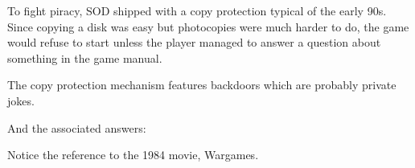 \documentclass[book.tex]{subfiles}
\begin{document}
   \par
\begin{figure}[H]
\centering
 \end{figure}
 \par

To fight piracy, SOD shipped with a copy protection typical of the early 90s. Since copying a disk was easy but photocopies were much harder to do, the game would refuse to start unless the player managed to answer a question about something in the game manual.\\
    \par
\begin{figure}[H]
\centering
 \end{figure}
 \par
 The copy protection mechanism features backdoors which are probably private jokes.
\par
\begin{minipage}{\textwidth}

\end{minipage}
\par
And the associated answers:\\
\par
\begin{minipage}{\textwidth}

\end{minipage}
\par
Notice the reference to the 1984 movie, Wargames.
    \par
\begin{figure}[H]
\centering
 \end{figure}
 \par
\end{document}
